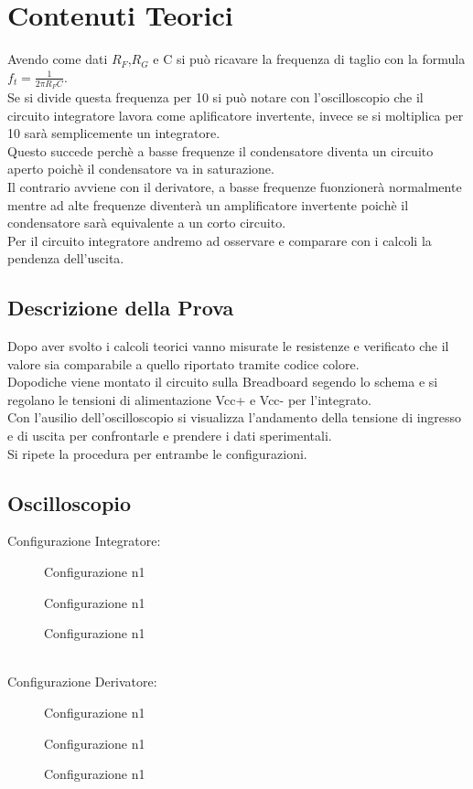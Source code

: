 \documentclass[12pt]{article}
\begin{document}
\section{Contenuti Teorici}
Avendo come dati $R_F$,$R_G$ e C si può ricavare la frequenza di taglio con la formula $f_t=\frac{1}{2 \pi R_F C}$.\\
Se si divide questa frequenza per 10 si può notare con l’oscilloscopio che il circuito integratore lavora come aplificatore invertente, invece se si moltiplica per 10 sarà semplicemente un integratore.\\
Questo succede perchè a basse frequenze il condensatore diventa un circuito aperto poichè il condensatore va in 
saturazione.\\
Il contrario avviene con il derivatore, a basse frequenze fuonzionerà normalmente mentre ad alte frequenze
diventerà un amplificatore invertente poichè il condensatore sarà equivalente a un corto circuito.\\
Per il circuito integratore andremo ad osservare e comparare con i calcoli la pendenza dell'uscita.\\
\subsection{Descrizione della Prova}
Dopo aver svolto i calcoli teorici vanno misurate le resistenze e verificato che il valore sia comparabile
a quello riportato tramite codice colore.\\
Dopodiche viene montato il circuito sulla Breadboard segendo lo schema e si regolano le tensioni di 
alimentazione Vcc+ e Vcc- per l’integrato.\\
Con l’ausilio dell’oscilloscopio si visualizza l’andamento della tensione di ingresso e di uscita per 
confrontarle e prendere i dati sperimentali.\\
Si ripete la procedura per entrambe le configurazioni.\\

\subsection{Oscilloscopio}
Configurazione Integratore:
\begin{figure}[h]
    \centering
    \caption{Configurazione n1}

    \caption{Configurazione n1}

    \caption{Configurazione n1}
\end{figure}
\\
Configurazione Derivatore:
\begin{figure}[h]
    \centering
    \caption{Configurazione n1}


    \caption{Configurazione n1}


    \caption{Configurazione n1}
\end{figure}
\\
\end{document}
